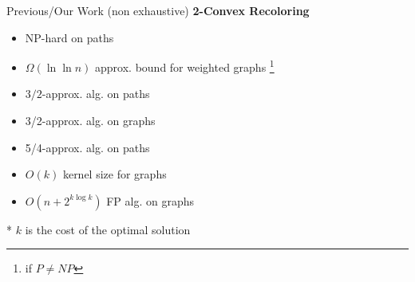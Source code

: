 \begin{frame}{Previous/\alert{Our} Work (non exhaustive)}
\textbf{2-Convex Recoloring}
\begin{itemize}


\pause\item
NP-hard on paths
{}


\pause\item
$\Omega(\ln\ln{n})$ approx. bound for weighted graphs
\footnote{if $P \neq NP$}
{}

\pause\item
$3/2$-approx. alg. on paths
{}

\pause\item
\alert{3/2-approx. alg. on graphs}

\pause\item
\alert{5/4-approx. alg. on paths}

\pause\item
\alert{$O(k)$ kernel size for graphs}

\pause\item
\alert{$O(n + 2^{k\log k})$ FP alg. on graphs}



\end{itemize}
* $k$ is the cost of the optimal solution
\end{frame}